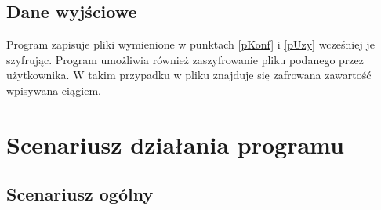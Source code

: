 \documentclass[a4paper]{article}
\begin{document}
\subsection{Dane wyjściowe}
Program zapisuje pliki wymienione w punktach \ref{pKonf} i \ref{pUzy} wcześniej je szyfrując. Program umożliwia również zaszyfrowanie pliku podanego przez użytkownika. W takim przypadku w pliku znajduje się zafrowana zawartość wpisywana ciągiem.

\section{Scenariusz działania programu}

\subsection{Scenariusz ogólny}
\end{document}
